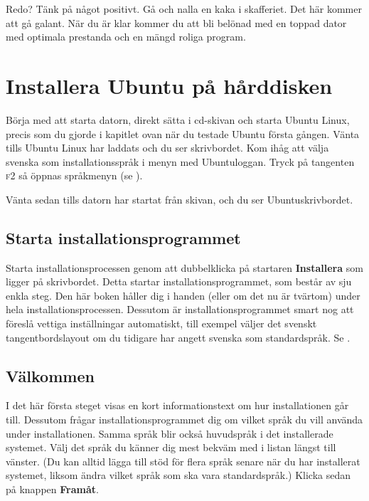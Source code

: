 \documentclass[a4paper,final]{memoir} %
\begin{document}
Redo? Tänk på något positivt. Gå och nalla en kaka i skafferiet. Det här kommer att gå galant. När du är klar kommer du att bli belönad med en toppad dator med optimala prestanda och en mängd roliga program. 

\section{Installera Ubuntu på hårddisken}


Börja med att starta datorn, direkt sätta i cd-skivan och starta Ubuntu Linux, precis som du gjorde i kapitlet ovan när du testade Ubuntu första gången. Vänta tills Ubuntu Linux har laddats och du ser skrivbordet. Kom ihåg att välja svenska som installationsspråk i menyn med Ubuntuloggan. Tryck på tangenten \textsc{f2} så öppnas språkmenyn (se ).

Vänta sedan tills datorn har startat från skivan, och du ser Ubuntuskrivbordet.

\subsection{Starta installationsprogrammet}

Starta installationsprocessen genom att dubbelklicka på startaren \textbf{Installera} som ligger på skrivbordet. Detta startar installationsprogrammet, som består av sju enkla steg. Den här boken håller dig i handen (eller om det nu är tvärtom) under hela installationsprocessen. Dessutom är installationsprogrammet smart nog att föreslå vettiga inställningar automatiskt, till exempel väljer det svenskt tangentbordslayout om du tidigare har angett svenska som standardspråk. Se .


\subsection{Välkommen}

I det här första steget visas en kort informationstext om hur installationen går till. Dessutom frågar installationsprogrammet dig om vilket språk du vill använda under installationen. Samma språk blir också huvudspråk i det installerade systemet. Välj det språk du känner dig mest bekväm med i listan längst till vänster. (Du kan alltid lägga till stöd för flera språk senare när du har installerat systemet, liksom ändra vilket språk som ska vara standardspråk.) Klicka sedan på knappen \textbf{Framåt}.
\end{document}
